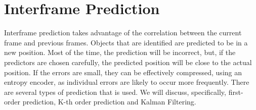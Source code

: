 \documentclass[a4paper,11pt]{report}
\begin{document}
% 
% 
% 
% 

\section{Interframe Prediction} 
\label{back_inter}

Interframe prediction takes advantage of the correlation between the current frame and previous frames. Objects that are identified are predicted to be in a new position. Most of the time, the prediction will be incorrect, but, if the predictors are chosen carefully, the predicted position will be close to the actual position. If the errors are small, they can be effectively compressed, using an entropy encoder, as individual errors are likely to occur more frequently. There are several types of prediction that is used. We will discuss, specifically, first-order prediction, K-th order prediction and Kalman Filtering.
\end{document}
